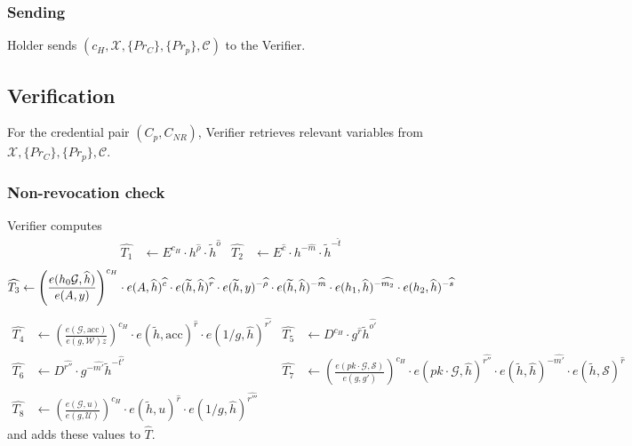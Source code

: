 \subsubsection{Sending}\label{sec:send}
 Holder sends $(c_H,\mathcal{X},\{Pr_C\},\{Pr_p\},\mathcal{C})$  to the Verifier.

\subsection{Verification}\label{sec:verify}
For the credential pair $(C_p,C_{NR})$, Verifier retrieves relevant variables from $\mathcal{X},\{Pr_C\},\{Pr_p\},\mathcal{C}$. 

\subsubsection{Non-revocation check}
 
Verifier computes
\begin{align}
\widehat{T_1}&\leftarrow E^{c_H}\cdot h^{\widehat{\rho}} \cdot \widetilde{h}^{\widehat{o}} &
\widehat{T_2}&\leftarrow E^{\widehat{c}}\cdot h^{-\widehat{m}}\cdot\widetilde{h}^{-\widehat{t}}
\end{align}
\begin{equation}
\widehat{T_3}\leftarrow\left(\frac{e(h_0\mathcal{G},\widehat{h})}{e(A,y)} \right)^{c_H} \cdot e(A,\widehat{h})^{\widehat{c}}\cdot e(\widetilde{h},\widehat{h})^{\widehat{r}}\cdot
e(\widetilde{h},y)^{-\widehat{\rho}}\cdot
e(\widetilde{h},\widehat{h})^{-\widehat{m}}\cdot
e(h_1,\widehat{h})^{-\widehat{m_2}}\cdot e(h_2,\widehat{h})^{-\widehat{s}}\\
\end{equation}
\begin{align}
\widehat{T_4}&\leftarrow\left(\frac{e(\mathcal{G},\mathrm{acc})}{e(g,\mathcal{W})z}\right)^{c_H} \cdot e(\widetilde{h},\mathrm{acc})^{\widehat{r}}\cdot
e(1/g,\widehat{h})^{\widehat{r'}}
&
\widehat{T_5}&\leftarrow D^{c_H}\cdot g^{\widehat{r}}\widetilde{h}^{\widehat{o'}}\\
\widehat{T_6}&\leftarrow  D^{\widehat{r''}}\cdot g^{-\widehat{m'}}
\widetilde{h}^{-\widehat{t'}}&
\widehat{T_7}&\leftarrow
\left(\frac{e(pk\cdot\mathcal{G},\mathcal{S})}{e(g,g')}\right)^{c_H}\cdot e(pk\cdot \mathcal{G},\widehat{h})^{\widehat{r''}}\cdot 
e(\widetilde{h},\widehat{h})^{-\widehat{m'}}\cdot
e(\widetilde{h},\mathcal{S})^{\widehat{r}}\\
\widehat{T_8}&\leftarrow \left(\frac{e(\mathcal{G},u)}{e(g,\mathcal{U})}\right)^{c_H}\cdot e(\widetilde{h},u)^{\widehat{r}}
\cdot e(1/g,\widehat{h})^{\widehat{r'''}}
\end{align}
and adds these values to $\widehat{T}$.


